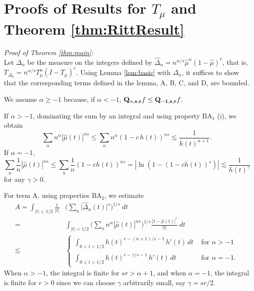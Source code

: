 \documentclass[11pt]{amsart}
\theoremstyle{definition}
\theoremstyle{remark}
\begin{document}
\section{Proofs of Results for $T_{\mu}$ and Theorem \ref{thm:RittResult}}%

\noindent \textit{Proof of Theorem \ref{thm:main}:}\\
Let $\Delta_n$ be
the measure on the integers defined by $\hat\Delta_n=n^{\alpha/s} \hat\mu^n (1-\hat\mu)^r$, that is, 
$T_{\Delta_n}=n^{\alpha/s} T_{\mu}^n (I-T_{\mu})^r$. Using Lemma \ref{lem:basic} with $\Delta_n$, it suffices to show that the corresponding terms defined in the lemma, A, B, C, and D, are bounded.

We assume $\alpha\ge -1$ because, if $\alpha<-1$, ${\bf Q_{\alpha,s,r}}f \le  {\bf Q_{-1,s,r}}f$. 


If $\alpha>-1$, dominating the sum by an integral and using property $\text{BA}_1$ (i), we obtain
\[\sum_n n^{\alpha}  |\hat\mu(t)|^{ns} \le \sum_n n^{\alpha}  (1-c \, h(t))^{ns}    \lesssim   \frac 1{h(t)^{\alpha+1}}.\]
If $\alpha=-1$, 
\[\sum_n \frac 1n  |\hat\mu(t)|^{ns} \le \sum_n \frac 1n  (1-ch(t))^{ns}= | \ln(1-(1-ch(t))^s) | 
 \lesssim \frac 1{h(t)^{\gamma}}\]
for any $\gamma>0$.




For term A, using properties $\text{BA}_2$, we estimate
\begin{align}
A=\int_{|t|<1/2} \frac1{|t|} &  \Big( \sum_n  \Big| \hat\Delta_n(t) \Big|^s \Big)^{1/s} \ dt \nonumber \\
= &    \int_{|t|<1/2}  \Big( \sum_n n^{\alpha} | \hat\mu(t)|^{ns} \Big)^{1/s} \frac{|1-\hat\mu(t)|^{r}}{|t|} \ dt \nonumber \\
\lesssim  & \begin{cases} \int_{0<t<1/2} h(t)^{r-(\alpha+1)/s-1}  \, h'(t) \, dt & \mbox{ for } \alpha>-1 \label{eq:A} \\ %
 \int_{0<t<1/2} h(t)^{r-\gamma/s-1}  \, h'(t) \, dt & \mbox{ for } \alpha=-1. 
 \end{cases}
  \end{align}
When $\alpha>-1$, the integral is finite for $sr >\alpha+1$, and when $\alpha=-1$, the integral is finite for $r>0$ 
since we can choose $\gamma$ arbitrarily small, say $\gamma=sr/2$.
\end{document}
